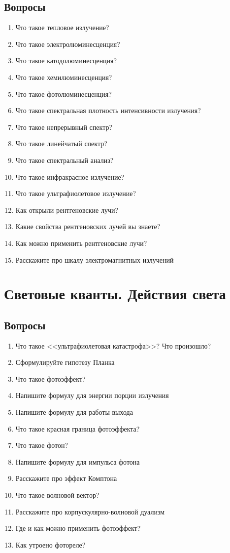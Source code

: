 \documentclass[12pt,a4paper]{report}
\begin{document}
\section{Вопросы}
\begin{enumerate}
\item Что такое тепловое излучение?
\item Что такое электролюминесценция?
\item Что такое катодолюминесценция?
\item Что такое хемилюминесценция?
\item Что такое фотолюминесценция?
\item Что такое спектральная плотность интенсивности излучения?
\item Что такое непрерывный спектр?
\item Что такое линейчатый спектр?
\item Что такое спектральный анализ?
\item Что такое инфракрасное излучение?
\item Что такое ультрафиолетовое излучение?
\item Как открыли рентгеновские лучи?
\item Какие свойства рентгеновских лучей вы знаете?
\item Как можно применить рентгеновские лучи?
\item Расскажите про шкалу электромагнитных излучений
\end{enumerate}

\chapter{Световые кванты. Действия света}
\section{Вопросы}
\begin{enumerate}
\item Что такое <<ультрафиолетовая катастрофа>>? Что произошло?
\item Сформулируйте гипотезу Планка
\item Что такое фотоэффект?
\item Напишите формулу для энергии порции излучения
\item Напишите формулу для работы выхода
\item Что такое красная граница фотоэффекта?
\item Что такое фотон?
\item Напишите формулу для импульса фотона
\item Расскажите про эффект Комптона
\item Что такое волновой вектор?
\item Расскажите про корпускулярно-волновой дуализм
\item Где и как можно применить фотоэффект?
\item Как утроено фотореле?
\end{enumerate}
\end{document}
